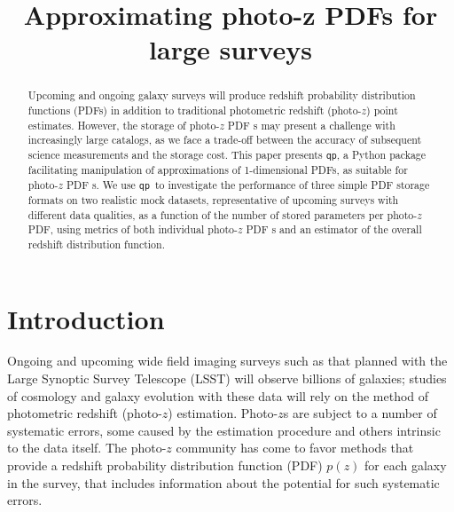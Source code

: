 \documentclass[\docopts]{\docclass}
\newcommand{\qp}{\texttt{qp}\xspace}
\newcommand{\pz}{photo-$z$ PDF\xspace}
\newcommand{\Pz}{Photo-$z$ PDF\xspace}
\begin{document}
\title{ Approximating photo-z PDFs for large surveys }


\begin{abstract}

Upcoming and ongoing galaxy surveys will produce redshift probability
distribution functions (PDFs) in addition to traditional photometric redshift
(photo-$z$) point estimates.  However, the storage of \pz s may present a
challenge with increasingly large catalogs, as we face a trade-off between the
accuracy of subsequent science measurements and the storage cost.  This paper
presents \qp, a Python package facilitating manipulation of approximations of
1-dimensional PDFs, as suitable for \pz s.  We use \qp\ to investigate the
performance of three simple PDF storage formats on two realistic mock datasets, representative of
upcoming surveys with different data qualities, as a function of the number of
stored parameters per \pz, using metrics of both individual \pz s and an
estimator of the overall redshift distribution function.

\end{abstract}


\maketitlepost





\section{Introduction}
\label{sec:intro}


Ongoing and upcoming wide field imaging surveys such as that planned with the Large Synoptic
Survey Telescope (LSST) will observe billions of galaxies; studies of cosmology
and galaxy evolution with these data will rely on the method of photometric redshift
(photo-$z$) estimation.  Photo-$z$s are subject to a number of systematic
errors, some caused by the estimation procedure and others intrinsic to the
data itself.  The photo-$z$ community has come to favor
methods that provide a redshift probability distribution function (PDF) $p(z)$ for each galaxy in the survey,
that includes information about the potential for such systematic errors.
\end{document}
